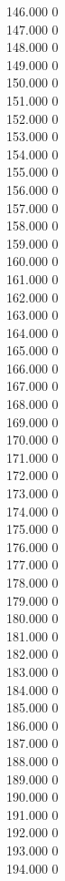 { 146.000	0 \\
 147.000	0 \\
 148.000	0 \\
 149.000	0 \\
 150.000	0 \\
 151.000	0 \\
 152.000	0 \\
 153.000	0 \\
 154.000	0 \\
 155.000	0 \\
 156.000	0 \\
 157.000	0 \\
 158.000	0 \\
 159.000	0 \\
 160.000	0 \\
 161.000	0 \\
 162.000	0 \\
 163.000	0 \\
 164.000	0 \\
 165.000	0 \\
 166.000	0 \\
 167.000	0 \\
 168.000	0 \\
 169.000	0 \\
 170.000	0 \\
 171.000	0 \\
 172.000	0 \\
 173.000	0 \\
 174.000	0 \\
 175.000	0 \\
 176.000	0 \\
 177.000	0 \\
 178.000	0 \\
 179.000	0 \\
 180.000	0 \\
 181.000	0 \\
 182.000	0 \\
 183.000	0 \\
 184.000	0 \\
 185.000	0 \\
 186.000	0 \\
 187.000	0 \\
 188.000	0 \\
 189.000	0 \\
 190.000	0 \\
 191.000	0 \\
 192.000	0 \\
 193.000	0 \\
 194.000	0 \\
}
